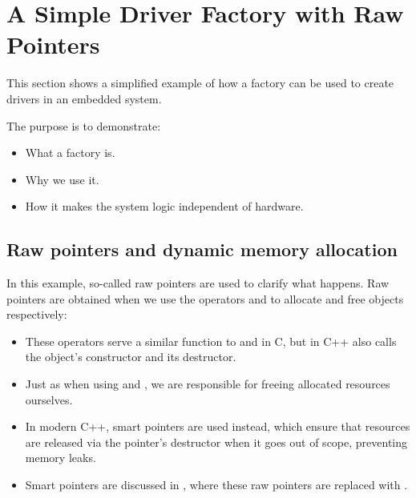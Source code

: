 
\section{A Simple Driver Factory with Raw Pointers}
\label{c4:sec:raw}\label{c4:app:a}
This section shows a simplified example of how a factory can be used to create drivers in an
embedded system.

The purpose is to demonstrate:
\begin{itemize}
  \item What a factory is.
  \item Why we use it.
  \item How it makes the system logic independent of hardware.
\end{itemize}

\subsection{Raw pointers and dynamic memory allocation}
\label{c4:sec:rawpointers}
In this example, so-called raw pointers are used to clarify what happens. Raw pointers are
obtained when we use the operators  and  to allocate and free objects
respectively:
\begin{itemize}
  \item These operators serve a similar function to  and  in C, but in
    C++  also calls the object's constructor and  its destructor.
  \item Just as when using  and , we are responsible for freeing
    allocated resources ourselves.
  \item In modern C++, smart pointers are used instead, which ensure that resources are released
    via the pointer's destructor when it goes out of scope, preventing memory leaks.
  \item Smart pointers are discussed in , where these raw pointers are replaced
    with .
\end{itemize}

